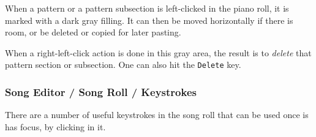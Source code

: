    When a pattern or a pattern subsection is left-clicked in the piano
   roll, it is marked with a dark gray filling.
   It can then be moved horizontally if there is room, or be deleted or copied
   for later pasting.

   When a right-left-click action is done in this gray area, the result
   is to \textsl{delete} that pattern section or subsection.
   One can also hit the \texttt{Delete} key.

\subsubsection{Song Editor / Song Roll / Keystrokes}
\label{subsubsec:song_editor_song_roll_keystrokes}

   There are a number of useful keystrokes in the song roll that can be used
   once is has focus, by clicking in it.


